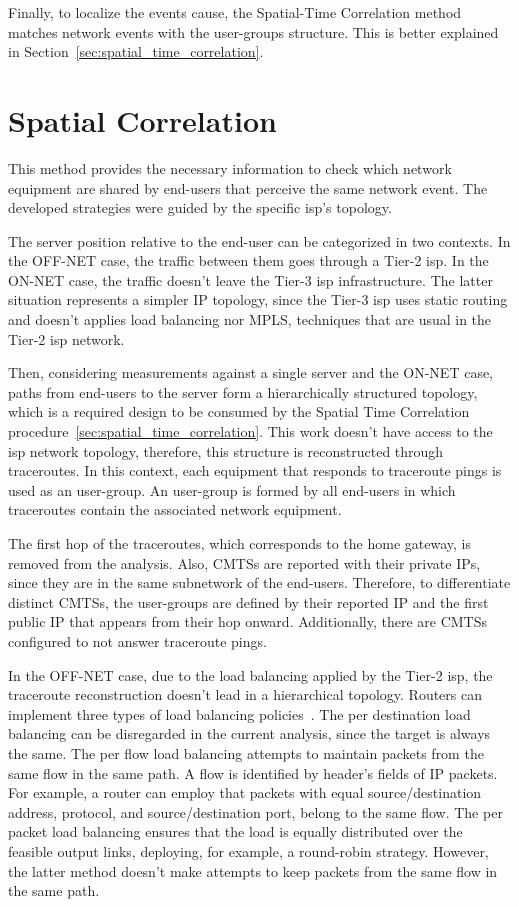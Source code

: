 Finally, to localize the events cause, the Spatial-Time Correlation method
matches network events with the user-groups structure.
This is better explained in Section~\ref{sec:spatial_time_correlation}.

\section{Spatial Correlation}
\label{sec:spatial_correlation}

This method provides the necessary information to check which network equipment
are shared by end-users that perceive the same network event.
The developed strategies were guided by the specific \gls*{isp}'s topology.

The server position relative to the end-user
can be categorized in two contexts.
In the OFF-NET case, the traffic between them
goes through a Tier-2 \gls*{isp}\@.
In the ON-NET case, the traffic
doesn't leave the Tier-3 \gls*{isp} infrastructure.
The latter situation represents a simpler IP topology, since the Tier-3 \gls*{isp}
uses static routing and
doesn't applies load balancing nor MPLS, techniques that are usual in the Tier-2
\gls*{isp} network.

Then, considering measurements against a single server and the ON-NET
case, paths from end-users to the server form a hierarchically
structured topology, which is a required design to be consumed by the
Spatial Time Correlation procedure~\ref{sec:spatial_time_correlation}.
This work doesn't have access to the \gls*{isp} network
topology, therefore, this structure is reconstructed through traceroutes.
In this context, each equipment that responds to traceroute
pings is used as an user-group.
An user-group is formed by all end-users in which traceroutes contain the
associated network equipment.

The first hop of the traceroutes, which corresponds to the home gateway, is
removed from the analysis. Also, CMTSs are reported with their private IPs,
since they are in the same subnetwork of the end-users.
Therefore, to differentiate distinct CMTSs, the
user-groups are defined by their reported IP and the first public IP that
appears from their hop onward. Additionally, there are CMTSs
configured to not answer traceroute pings.

In the OFF-NET case, due to the load balancing applied by the Tier-2 \gls*{isp},
the traceroute reconstruction doesn't lead in a hierarchical topology.
Routers can implement three types of load balancing
policies~\cite{avoiding_traceroute_anomalies_with_paris_traceroute}.
The per
destination load balancing can be disregarded in the current analysis, since
the target is always the same. The per flow load balancing attempts to
maintain packets from the same flow in the same path. A flow is identified
by header's fields of IP packets. For example, a
router can employ that packets with equal source/destination
address, protocol, and source/destination port,
belong to the same flow. The per packet load
balancing ensures that the load is equally distributed over the feasible output
links, deploying, for example, a round-robin strategy. However, the latter
method doesn't
make attempts to keep packets from the same flow in the same path.

